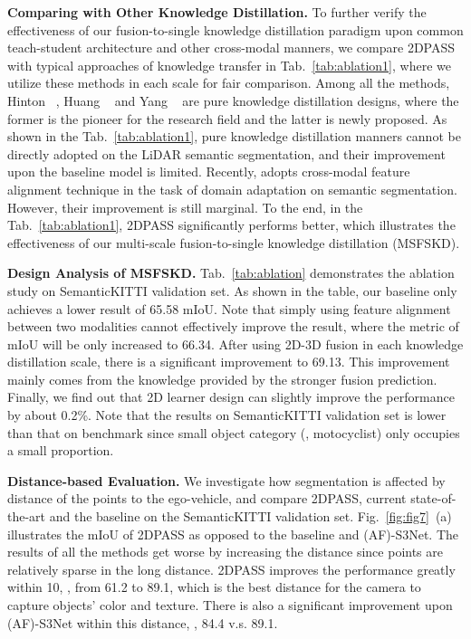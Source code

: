 \documentclass[runningheads]{llncs}
\begin{document}
	
	\noindent\textbf{Comparing with Other Knowledge Distillation.}
	To further verify the effectiveness of our fusion-to-single knowledge distillation paradigm upon common teach-student architecture and other cross-modal manners, we compare 2DPASS with typical approaches of knowledge transfer in Tab.~\ref{tab:ablation1}, where we utilize these methods in each scale for fair comparison.
Among all the methods, Hinton \etal~\cite{hinton2015distilling}, Huang \etal~\cite{huang2021revisiting} and Yang \etal~\cite{yang2021knowledge} are pure knowledge distillation designs, where the former is the pioneer for the research field and the latter is newly proposed.
As shown in the Tab.~\ref{tab:ablation1}, pure knowledge distillation manners cannot be directly adopted on the LiDAR semantic segmentation, and their improvement upon the baseline model is limited.
Recently, \cite{jaritz2020xmuda} adopts cross-modal feature alignment technique in the task of domain adaptation on semantic segmentation.
However, their improvement is still marginal.
To the end, in the Tab.~\ref{tab:ablation1}, 2DPASS significantly performs better, which illustrates the effectiveness of our multi-scale fusion-to-single knowledge distillation (MSFSKD).
	
	\noindent\textbf{Design Analysis of MSFSKD.}
	Tab.~\ref{tab:ablation} demonstrates the ablation study on SemanticKITTI validation set.
As shown in the table, our baseline only achieves a lower result of 65.58 mIoU.
Note that simply using feature alignment between two modalities cannot effectively improve the result, where the metric of mIoU will be only increased to 66.34.
After using 2D-3D fusion in each knowledge distillation scale, there is a significant improvement to 69.13.
This improvement mainly comes from the knowledge provided by the stronger fusion prediction.
Finally, we find out that 2D learner design can slightly improve the performance by about 0.2\%.
Note that the results on SemanticKITTI validation set is lower than that on benchmark since small object category (\ie, motocyclist) only occupies a small proportion.
	

	
	\noindent\textbf{Distance-based Evaluation.}
	We investigate how segmentation is affected by distance of the points to the ego-vehicle, and compare 2DPASS, current state-of-the-art and the baseline on the SemanticKITTI validation set.
Fig.~\ref{fig:fig7}~(a) illustrates the mIoU of 2DPASS as opposed to the baseline and (AF)-S3Net.
The results of all the methods get worse by increasing the distance since points are relatively sparse in the long distance. 
2DPASS improves the performance greatly within 10, \ie, from 61.2 to 89.1, which is the best distance for the camera to capture objects' color and texture.
There is also a significant improvement upon (AF)-S3Net within this distance, \ie, 84.4 v.s. 89.1.
	
\end{document}

